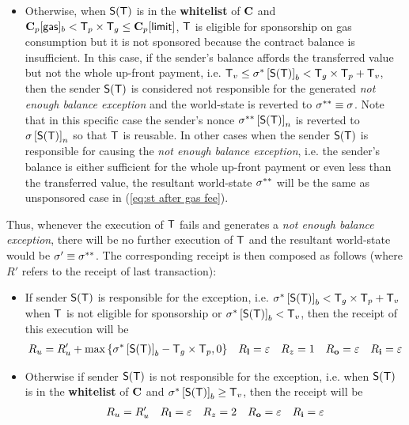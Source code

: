 \begin{itemize}[nosep]
\begin{itemize}
		\item Otherwise, when $\mathsf{S}{\left({\textsf{T}} \right)}$ is in the \textbf{whitelist} of $\mathbf{C}$ and $\mathbf{C}_p[{\sf gas}]_b< \textsf{T}_p\times \textsf{T}_g \le \mathbf{C}_p[{\sf limit}]$,
		$\textsf{T}$ is eligible for sponsorship on gas consumption but it is not sponsored because the contract balance is insufficient.
		In this case, if the sender's balance affords the transferred value but not the whole up-front payment,
		i.e. $\textsf{T}_v\le \mathbf{\sigma}^{*} \left[\mathsf{S}{\left({\textsf{T}} \right)}\right]_b < \textsf{T}_g\times\textsf{T}_p+\textsf{T}_v$,
		then the sender $\mathsf{S}{\left({\textsf{T}} \right)}$ is considered not responsible for the generated \emph{not enough balance exception} and the world-state is reverted to $\mathbf{\sigma}^{**}\equiv\mathbf{\sigma}$. 
		Note that in this specific case the sender's nonce $\mathbf{\sigma}^{**}\left[\mathsf{S}{\left({\textsf{T}} \right)}\right]_n$ is reverted to $\mathbf{\sigma}\left[\mathsf{S}{\left({\textsf{T}} \right)}\right]_n$ so that $\textsf{T}$ is reusable.
		In other cases when the sender $\mathsf{S}{\left({\textsf{T}} \right)}$ is responsible for causing the \emph{not enough balance exception},
		i.e. the sender's balance is either sufficient for the whole up-front payment or even less than the transferred value, 
		the resultant world-state $\mathbf{\sigma}^{**}$ will be the same as unsponsored case in (\ref{eq:st after gas fee}).
	\end{itemize}
\end{itemize}

Thus,
whenever the execution of $\textsf{T}$ fails and generates a \emph{not enough balance exception}, 
there will be no further execution of $\textsf{T}$ and
the resultant world-state would be $\mathbf{\sigma}'\equiv\mathbf{\sigma}^{**}$. 
The corresponding receipt is then composed as follows (where $R'$ refers to the receipt of last transaction):
\begin{itemize}[nosep]
	\item If sender $\mathsf{S}{\left({\textsf{T}} \right)}$ is responsible for the exception, i.e. $\mathbf{\sigma}^{*} \left[\mathsf{S}{\left({\textsf{T}} \right)}\right]_b<\textsf{T}_g\times\textsf{T}_p+\textsf{T}_v$ when $\textsf{T}$ is not eligible for sponsorship or $\mathbf{\sigma}^{*} \left[\mathsf{S}{\left({\textsf{T}} \right)}\right]_b<\textsf{T}_v$,
	then the receipt of this execution will be 
	\begin{align}
		R_u=R'_u+\max{\left \{{\ensuremath{\mathbf{\sigma}}^*\left[\ensuremath{\mathsf{S}{\left({\textsf{T}} \right)}}\right]_b-\textsf{T}_g\times\textsf{T}_p,0} \right \}} && R_{\bf l}=\mathbb{\varepsilon} && R_z=1 && R_{\bf o}=\mathbb{\varepsilon} && R_{\bf i}=\mathbb{\varepsilon}
	\end{align}

	\item Otherwise if sender $\mathsf{S}{\left({\textsf{T}} \right)}$ is not responsible for the exception,
	i.e. when $\mathsf{S}{\left({\textsf{T}} \right)}$ is in the {\bf whitelist} of $\mathbf{C}$ and
	$\mathbf{\sigma}^{*} \left[\mathsf{S}{\left({\textsf{T}} \right)}\right]_b\ge \textsf{T}_v$,
	then the receipt will be
	\begin{align}
		R_u=R'_u && R_{\bf l}=\mathbb{\varepsilon} && R_z=2 && R_{\bf o}=\mathbb{\varepsilon} && R_{\bf i}=\mathbb{\varepsilon}
	\end{align}
\end{itemize} 





